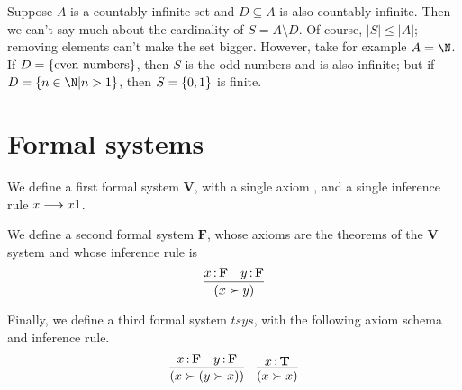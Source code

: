 \documentclass[11pt,letterpaper]{article}
\begin{document}
\begin{rem}
  Suppose $A$ is a countably infinite set and $D \subseteq A$ is also
  countably infinite.
  Then we can't say much about the cardinality of $S = A \setminus D$.
  Of course, $|S| \leq |A|$; removing elements can't make the set bigger.
  However, take for example $A = \N$. If $D = \left\{\text{even numbers}\right\}$,
  then $S$ is the odd numbers and is also infinite;
  but if $D = \setof{n \in \N | n > 1}$,
  then $S = \left\{0, 1\right\}$ is finite.
\end{rem}

\section{Formal systems}

\newcommand{\vsys}{\mathbf{V}}
\newcommand{\fsys}{\mathbf{F}}
\newcommand{\tsys}{\mathbf{T}}

We define a first formal system $\vsys$, with a single axiom ,
and a single inference rule $x \longrightarrow x1$.

We define a second formal system $\fsys$, whose axioms are the theorems of the
$\vsys$ system and whose inference rule is
%
\begin{equation*}
  \infer{(x \succ y)}{%
    x \hastype \fsys
    &
    y \hastype \fsys
  }
\end{equation*}

Finally, we define a third formal system $tsys$, with the following axiom
schema and inference rule.
%
\begin{equation*}
  \infer{(x \succ (y \succ x))}{%
    x \hastype \fsys
    &
    y \hastype \fsys
  }
  \quad
  \infer{(x \succ x)}{%
    x \hastype \tsys
  }
\end{equation*}
\end{document}

